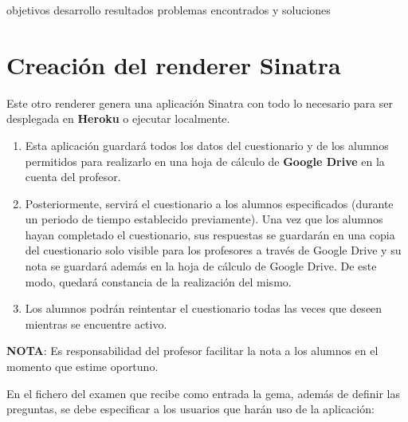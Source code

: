 

objetivos
desarrollo
resultados
problemas encontrados y soluciones


\section{Creaci\'on del renderer Sinatra}
\label{:sec3}

Este otro renderer genera una aplicaci\'on Sinatra con todo lo necesario para ser desplegada en {\bfseries Heroku} o ejecutar localmente. 
\bigskip

\begin{enumerate}
  \item Esta aplicaci\'on guardar\'a todos los datos del cuestionario y de los alumnos permitidos para realizarlo en una hoja de c\'alculo de {\bfseries Google Drive}
  en la cuenta del profesor.

\item Posteriormente, servir\'a el cuestionario a los alumnos especificados (durante un periodo de tiempo establecido previamente). Una vez que los alumnos hayan
  completado el cuestionario, sus respuestas se guardar\'an en una copia del cuestionario solo visible para los profesores a trav\'es de Google Drive y su
  nota se guardar\'a adem\'as en la hoja de c\'alculo de Google Drive. De este modo, quedar\'a constancia de la realizaci\'on del mismo.
  \bigskip

\item Los alumnos podr\'an reintentar el cuestionario todas las veces que deseen mientras se encuentre activo.

\end{enumerate}

{\bfseries NOTA}: Es responsabilidad del profesor facilitar la nota a los alumnos en el momento que estime oportuno.
\bigskip

En el fichero del examen que recibe como entrada la gema, adem\'as de definir las preguntas, se debe especificar a los usuarios que har\'an
uso de la aplicaci\'on:

